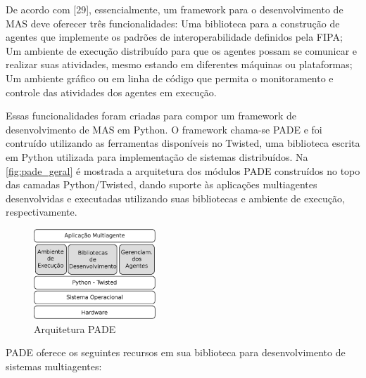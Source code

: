 \documentclass[journal]{IEEEtran}
\begin{document}
De acordo com [29], essencialmente, um framework para o desenvolvimento de MAS deve oferecer três funcionalidades:
Uma biblioteca para a construção de agentes que implemente os padrões de interoperabilidade definidos pela FIPA;
Um ambiente de execução distribuído para que os agentes possam se comunicar e realizar suas atividades, mesmo estando em diferentes máquinas ou plataformas;
Um ambiente gráfico ou em linha de código que permita o monitoramento e controle das atividades dos agentes em execução.

Essas funcionalidades foram criadas para compor um framework de desenvolvimento de MAS em Python. O framework chama-se PADE e foi contruído utilizando as ferramentas disponíveis no Twisted, uma biblioteca escrita em Python utilizada para implementação de sistemas distribuídos. Na \autoref{fig:pade_geral} é mostrada a arquitetura dos módulos PADE construídos no topo das camadas Python/Twisted, dando suporte às aplicações multiagentes desenvolvidas e executadas utilizando suas bibliotecas e ambiente de execução, respectivamente.

\begin{figure}[htb]
    \centering
    \includegraphics[width=1.8in]{Figuras/pade-visao-geral.eps}
    \caption{\label{fig:pade_geral} Arquitetura PADE}
\end{figure}


PADE oferece os seguintes recursos em sua biblioteca para desenvolvimento de sistemas multiagentes:
\end{document}
